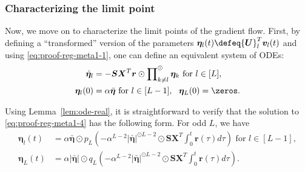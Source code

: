 \documentclass{article} %
\def\vr{{\bm{r}}}
\def\vv{{\bm{v}}}
\def\mS{{\bm{S}}}
\def\mU{{\bm{U}}}
\def\mX{{\bm{X}}}
\newcommand{\veta}{{\bm{\eta}}}
\begin{document}
\subsubsection{Characterizing the limit point}
Now, we move on to characterize the limit points of the gradient flow. First, by defining a ``transformed'' version of the parameters $\veta_l(t) \defeq \mU_l^T \vv_l(t)$ and using \eqref{eq:proof-reg-meta1-1}, one can define an equivalent system of ODEs:
\begin{equation}
\label{eq:proof-reg-meta1-4}
\begin{aligned}
    \dot \veta_l &= -\mS \mX^T \vr \odot \prod\nolimits_{k \neq l}^{\odot} \veta_k \text{ for } l \in [L],\\
    \veta_l(0) &= \alpha \bar \veta \text { for } l \in [L-1],~~\veta_L(0) = \zeros.
\end{aligned}
\end{equation}

Using Lemma~\ref{lem:ode-real}, it is straightforward to verify that the solution to \eqref{eq:proof-reg-meta1-4} has the following form. For odd $L$, we have
\begin{equation}
\label{eq:proof-reg-meta1-5}
\begin{aligned}
    \veta_l(t) &= \alpha \bar \veta \odot p_L \left (-\alpha^{L-2} |\bar \veta|^{\odot L-2} \odot \mS \mX^T \int_0^t \vr(\tau)d\tau \right) \text{ for } l \in [L-1],\\
    \veta_L(t) &= \alpha |\bar \veta| \odot q_L\left (- \alpha^{L-2} |\bar \veta|^{\odot L-2} \odot \mS \mX^T \int_0^t \vr(\tau)d\tau \right).
\end{aligned}
\end{equation}
\end{document}
